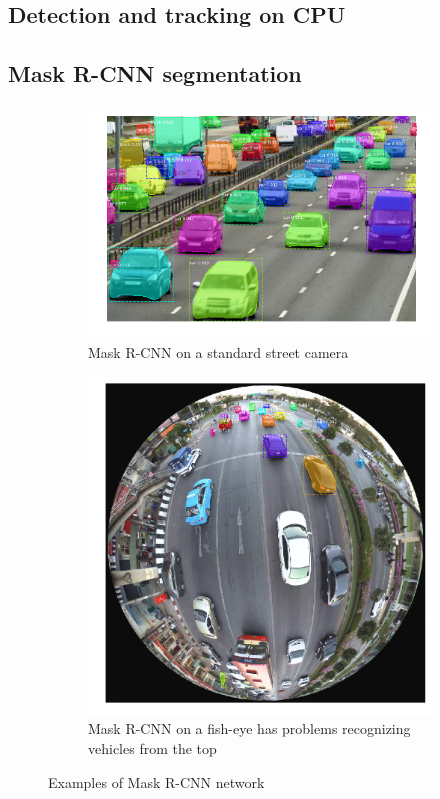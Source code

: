 \documentclass[a4paper,12pt,titlepage]{article}
\numberwithin{figure}{section}
\begin{document}
\subsection{Detection and tracking on CPU}

\subsection{Mask R-CNN segmentation}
\begin{figure}
    \begin{subfigure}[Sample1]{0.5\linewidth}
    	\includegraphics[width=0.95\linewidth]{fig/Mask-RCNN-road.png} 
        \caption{Mask R-CNN on a standard street camera}
        \label{fig:mask-street-cam}
    \end{subfigure}
    \quad
    \begin{subfigure}[Sample1]{0.5\linewidth} 
    	\includegraphics[width=0.95\linewidth]{fig/Mask-RCNN-omni.png}
        \caption{Mask R-CNN on a fish-eye has problems recognizing vehicles from the top}   
        \label{fig:mask-omni-cam}
    \end{subfigure}
    \caption{Examples of Mask R-CNN network \cite{he2017mask}}
    \label{fig:facenet}
\end{figure}
\end{document}
